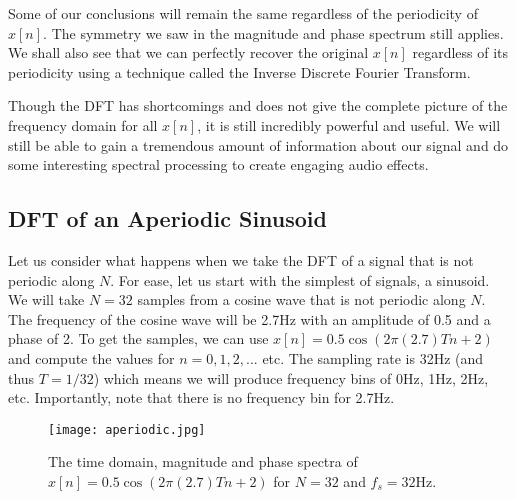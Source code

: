Some of our conclusions will remain the same regardless of the periodicity of $x[n]$.  The symmetry we saw 
in the magnitude and phase spectrum still applies.  We shall also see that we can perfectly recover the 
original $x[n]$ regardless
of its periodicity using a technique called the Inverse Discrete Fourier Transform.

Though the DFT has shortcomings and does not give the complete picture of the frequency domain for
all $x[n]$, it is still incredibly powerful and useful.  We will still be able to gain a tremendous amount of
information about our signal and do some interesting spectral processing to create engaging audio effects.

\subsection*{DFT of an Aperiodic Sinusoid}

Let us consider what happens when we take the DFT of a signal that is not periodic along $N$.  For ease, let us
start with the simplest of signals, a sinusoid.  We will take $N = 32$ samples from a cosine wave 
that is not periodic along $N$.  The frequency of the cosine wave will be 2.7Hz with an amplitude of 0.5 and a phase of
2.  To get the samples, we can use $x[n] = 0.5\cos(2\pi (2.7)Tn + 2)$ and compute the values for 
$n = 0, 1, 2,...$ etc.
The sampling rate is 32Hz (and thus $T = 1/32$) 
which means we will produce frequency bins of 0Hz, 1Hz, 2Hz, etc.  Importantly, note that there is no frequency bin 
for 2.7Hz.  

\begin{figure}[h]
	\caption{The time domain, magnitude and phase spectra of $x[n] = 0.5\cos(2\pi (2.7)Tn + 2)$
	for $N = 32$ and $f_s = 32$Hz.}
	\label{fig:aperiodicGraph}
	\begin{center}
		\texttt{[image: aperiodic.jpg]}
	\end{center}
\end{figure}

